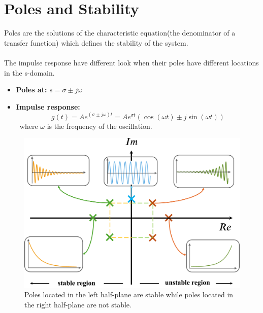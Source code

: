 \section{Poles and Stability}
Poles are the solutions of the characteristic equation(the denominator of a transfer function) which defines the stability of the system.\\\\
The impulse response have different look when their poles have different locations in the s-domain.
\begin{itemize}
    \item \textbf{Poles at:} $s = \sigma \pm j\omega$
    
    \item \textbf{Impulse response:}
    \[ g(t) = Ae^{(\sigma \pm j\omega)t} = Ae^{\sigma t}(\cos(\omega t)\pm j\sin(\omega t))\]
    \ where $\omega$ is the frequency of the oscillation.
\end{itemize}

\begin{figure}[H] 
    \centering
    \includegraphics[width=.7\textwidth]{images/pole_location.eps}
    \caption{Poles located in the left half-plane are stable while poles located in the right half-plane are not stable.}
\end{figure}


